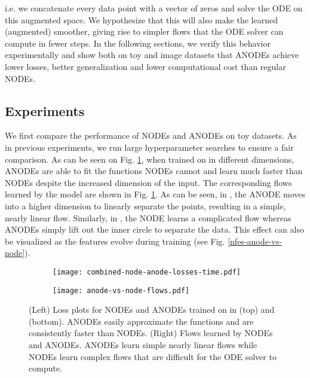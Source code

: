 \documentclass{article}
\begin{document}
i.e. we concatenate every data point  with a vector of zeros and solve the ODE on this augmented space. We hypothesize that this will also make the learned (augmented)  smoother, giving rise to simpler flows that the ODE solver can compute in fewer steps. In the following sections, we verify this behavior experimentally and show both on toy and image datasets that ANODEs achieve lower losses, better generalization and lower computational cost than regular NODEs.

\subsection{Experiments}\label{experiments-section}
We first compare the performance of NODEs and ANODEs on toy datasets. As in previous experiments, we run large hyperparameter searches to ensure a fair comparison. As can be seen on Fig. \ref{flows-losses-anode-vs-node}, when trained on  in different dimensions, ANODEs are able to fit the functions NODEs cannot and learn much faster than NODEs despite the increased dimension of the input. The corresponding flows learned by the model are shown in Fig. \ref{flows-losses-anode-vs-node}. As can be seen, in , the ANODE moves into a higher dimension to linearly separate the points, resulting in a simple, nearly linear flow. Similarly, in , the NODE learns a complicated flow whereas ANODEs simply lift out the inner circle to separate the data. This effect can also be visualized as the features evolve during training (see Fig. \ref{nfes-anode-vs-node}).
\begin{figure}[b]
\vspace{-12pt}
\centering
\begin{subfigure}[t]{0.31\linewidth}
\centering
\texttt{[image: combined-node-anode-losses-time.pdf]}
\end{subfigure}\hspace{0.1\linewidth}
\begin{subfigure}[t]{0.44\linewidth}
\centering
\texttt{[image: anode-vs-node-flows.pdf]}
\end{subfigure}\hspace{0.01\linewidth}
\caption{(Left) Loss plots for NODEs and ANODEs trained on  in  (top) and  (bottom). ANODEs easily approximate the functions and are consistently faster than NODEs. (Right) Flows learned by NODEs and ANODEs. ANODEs learn simple nearly linear flows while NODEs learn complex flows that are difficult for the ODE solver to compute.}
\label{flows-losses-anode-vs-node}
\end{figure}
\end{document}
